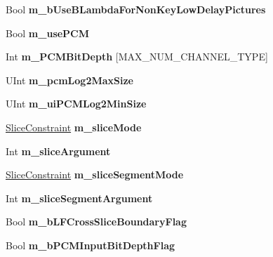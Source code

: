 \begin{DoxyCompactItemize}
Bool {\bfseries m\+\_\+b\+Use\+B\+Lambda\+For\+Non\+Key\+Low\+Delay\+Pictures}
\item 
\mbox{\label{class_t_enc_cfg_a00f4b0f7c2c390d9d084f2bcf4b038f3}} 
Bool {\bfseries m\+\_\+use\+P\+CM}
\item 
\mbox{\label{class_t_enc_cfg_abdce13d10fda1b77d72c5f2f21f79df4}} 
Int {\bfseries m\+\_\+\+P\+C\+M\+Bit\+Depth} \mbox{[}M\+A\+X\+\_\+\+N\+U\+M\+\_\+\+C\+H\+A\+N\+N\+E\+L\+\_\+\+T\+Y\+PE\mbox{]}
\item 
\mbox{\label{class_t_enc_cfg_aff01cb60c71f5f22a8dc24afb2acf199}} 
U\+Int {\bfseries m\+\_\+pcm\+Log2\+Max\+Size}
\item 
\mbox{\label{class_t_enc_cfg_ab00da96e350b42194707bad486902f9e}} 
U\+Int {\bfseries m\+\_\+ui\+P\+C\+M\+Log2\+Min\+Size}
\item 
\mbox{\label{class_t_enc_cfg_aea03808e1160380b7f10e670d9164074}} 
\hyperlink{_type_def_8h_add7235a66eb4e5f93c692468c39dde44}{Slice\+Constraint} {\bfseries m\+\_\+slice\+Mode}
\item 
\mbox{\label{class_t_enc_cfg_a181c2c56c81b9025f577f3fceb862c91}} 
Int {\bfseries m\+\_\+slice\+Argument}
\item 
\mbox{\label{class_t_enc_cfg_af994065faddaa5354d983691914d0f13}} 
\hyperlink{_type_def_8h_add7235a66eb4e5f93c692468c39dde44}{Slice\+Constraint} {\bfseries m\+\_\+slice\+Segment\+Mode}
\item 
\mbox{\label{class_t_enc_cfg_a893d67d5dac5058f691cfc03ea23491c}} 
Int {\bfseries m\+\_\+slice\+Segment\+Argument}
\item 
\mbox{\label{class_t_enc_cfg_a01770fb20f416c67b4ee4494065ca6cd}} 
Bool {\bfseries m\+\_\+b\+L\+F\+Cross\+Slice\+Boundary\+Flag}
\item 
\mbox{\label{class_t_enc_cfg_a3b18e64ea29801e888ab6fcfa72b6f4a}} 
Bool {\bfseries m\+\_\+b\+P\+C\+M\+Input\+Bit\+Depth\+Flag}
\item 
\mbox{\label{class_t_enc_cfg_a93eba02fd26bf2c1422f16c4df88693b}} 

\end{DoxyCompactItemize}
